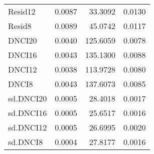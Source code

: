 \begin{longtable}{l|rrr}
Resid12 & 0.0087 & 33.3092 & 0.0130 \\ 
Resid8 & 0.0089 & 45.0742 & 0.0117 \\ 
DNCI20 & 0.0040 & 125.6059 & 0.0078 \\ 
DNCI16 & 0.0043 & 135.1300 & 0.0088 \\ 
DNCI12 & 0.0038 & 113.9728 & 0.0080 \\ 
DNCI8 & 0.0043 & 137.6073 & 0.0085 \\ 
sd.DNCI20 & 0.0005 & 28.4018 & 0.0017 \\ 
sd.DNCI16 & 0.0005 & 25.6517 & 0.0016 \\ 
sd.DNCI12 & 0.0005 & 26.6995 & 0.0020 \\ 
sd.DNCI8 & 0.0004 & 27.8177 & 0.0016 \\ 
\bottomrule
\end{longtable}

